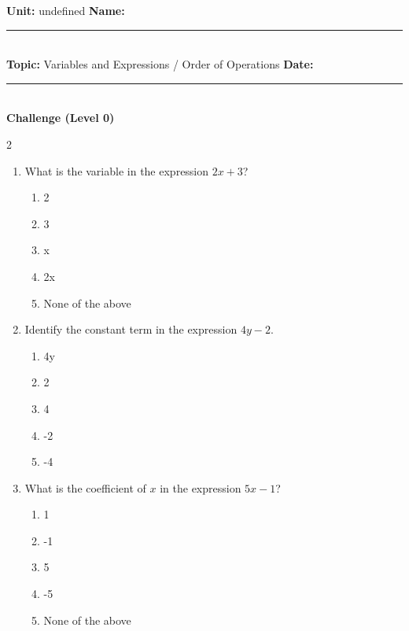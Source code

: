\documentclass[10pt]{article}
\begin{document}
\enlargethispage{2.5cm}

\begin{tcolorbox}[colback=mainblue!5, colframe=mainblue, sharp corners, boxrule=0.5pt]
    \small \textbf{Unit:} undefined \hfill \textbf{Name:} \rule{3cm}{0.4pt} \\
    \small \textbf{Topic:} Variables and Expressions / Order of Operations \hfill \textbf{Date:} \rule{2cm}{0.4pt} \\
    \centering \textbf{\large Challenge (Level 0)}
\end{tcolorbox}

\vspace{0.2cm}

\begin{multicols}{2}
\begin{enumerate}[label=\textbf{Q\arabic*.}, leftmargin=*, itemsep=6pt, parsep=0pt]

  \item \small What is the variable in the expression $2x + 3$?
  \begin{enumerate}[label=(\Alph*), leftmargin=0.6cm, nosep, itemsep=2pt]
    \item 2
    \item 3
    \item x
    \item 2x
    \item None of the above
  \end{enumerate}

  \item \small Identify the constant term in the expression $4y - 2$.
  \begin{enumerate}[label=(\Alph*), leftmargin=0.6cm, nosep, itemsep=2pt]
    \item 4y
    \item 2
    \item 4
    \item -2
    \item -4
  \end{enumerate}

  \item \small What is the coefficient of $x$ in the expression $5x - 1$?
  \begin{enumerate}[label=(\Alph*), leftmargin=0.6cm, nosep, itemsep=2pt]
    \item 1
    \item -1
    \item 5
    \item -5
    \item None of the above
  \end{enumerate}


\end{enumerate}
\end{multicols}
\end{document}
